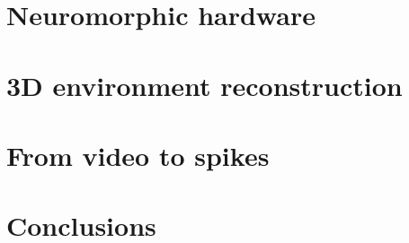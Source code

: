 \documentclass[11pt,a4paper]{memoir}
\begin{document}
  \chapter{Neuromorphic hardware}
  \label{chp:neuro-hw}
  

  \chapter{3D environment reconstruction}
  \label{chp:reconstruction}
  


  \chapter{From video to spikes}
  \label{chp:img2spk}
  

  \chapter{Conclusions}
  \label{chp:conclusions}
  

  \printbibliography
\end{document}

